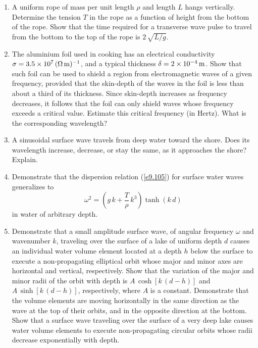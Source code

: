 {\begin{enumerate}
\item A uniform rope of mass per unit length $\rho$ and length $L$ hangs vertically.
Determine the tension $T$ in the rope as a function of height from the bottom
of the rope. Show that the time required for a transverse wave pulse to
travel from the bottom to the top of the rope is $2\,\sqrt{L/g}$. 

\item The aluminium foil  used in cooking has an electrical conductivity $\sigma=3.5\times 10^7\,(\Omega\,{\rm m})^{-1}$,
and a typical thickness $\delta=2\times 10^{-4}\,{\rm m}$. Show that such foil can be used to shield a region from electromagnetic
waves of a given frequency, provided that the skin-depth of the waves in the foil is less than about a third of its thickness. 
Since skin-depth increases as frequency decreases, it follows that the foil can only shield waves whose frequency exceeds a critical
value. 
Estimate this critical frequency (in Hertz). What is the corresponding wavelength?

\item A sinusoidal surface wave travels from deep water toward the shore. Does its
wavelength increase, decrease, or stay the same, as it approaches the shore? Explain.

\item Demonstrate that the dispersion relation (\ref{e9.105}) for surface water waves generalizes to
$$
\omega^2 =  \left(g\,k + \frac{T}{\rho}\,k^3\right)\tanh(k\,d)
$$
in water of arbitrary depth. 

\item Demonstrate that a  small amplitude surface wave, of angular frequency $\omega$ and wavenumber $k$, traveling over the surface of a lake of uniform depth $d$ causes an individual water volume element located at a depth $h$ below the surface to execute a non-propagating elliptical orbit
whose major and minor axes are horizontal and vertical, respectively. Show that
the  variation of the major and minor radii of the orbit with depth is $A\,\cosh[k\,(d-h)]$
and $A\,\sinh[k\,(d-h)]$, respectively, where $A$ is a constant. Demonstrate that
the volume elements are moving horizontally in the same direction as the wave
at the top of their orbits, and in the opposite direction at the bottom. 
Show that a surface wave traveling over the surface of a very deep lake causes water volume elements to execute
non-propagating circular orbits whose radii decrease exponentially with depth. 

\end{enumerate}
}